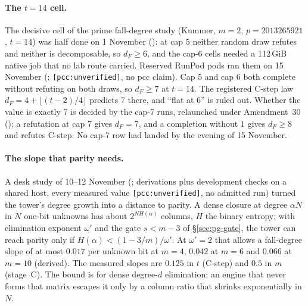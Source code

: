 \paragraph{The $t=14$ cell.} The decisive cell of the prime fall-degree
study (Kummer, $m=2$, $p=2013265921$, $t=14$) was half done on 1 November
(): at cap 5 neither random
draw refutes and neither is decomposable, so $d_F\ge6$, and the cap-6 cells
needed a 112\,GiB native job that no lab route carried. Reserved RunPod
pods ran them on 15 November
(;
\texttt{[pcc:unverified]}, no pcc claim). Cap 5 and cap 6 both complete
without refuting on both draws, so $d_F\ge7$ at $t=14$. The registered
C-step law $d_F=4+\lfloor(t-2)/4\rfloor$ predicts 7 there, and ``flat at 6''
is ruled out. Whether the value is exactly 7 is decided by the cap-7 runs,
relaunched under Amendment~30
(); a refutation
at cap 7 gives $d_F=7$, and a completion without $1$ gives $d_F\ge8$ and
refutes C-step. No cap-7 row had landed by the evening of 15 November.

\paragraph{The slope that parity needs.} A desk study of 10--12 November
(; derivations plus
development checks on a shared host, every measured value
\texttt{[pcc:unverified]}, no admitted run) turned the tower's degree growth
into a distance to parity. A dense closure at degree $\alpha N$ in $N$
one-bit unknowns has about $2^{N H(\alpha)}$ columns, $H$ the binary entropy;
with elimination exponent $\omega'$ and the gate $s<m-3$ of
\S\ref{sec:pg-gate}, the tower can reach parity only if
$H(\alpha)<(1-3/m)/\omega'$. At $\omega'=2$ that allows a fall-degree slope
of at most $0.017$ per unknown bit at $m=4$, $0.042$ at $m=6$ and $0.066$
at $m=10$ (derived). The measured slopes are $0.125$ in $t$ (C-step) and
$0.5$ in $m$ (stage~C). The bound is for dense degree-$d$ elimination; an
engine that never forms that matrix escapes it only by a column ratio that
shrinks exponentially in $N$.

